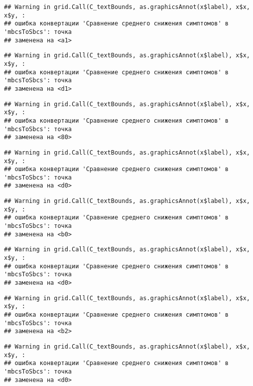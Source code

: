 \documentclass[
]{article}
\begin{document}
\begin{verbatim}
## Warning in grid.Call(C_textBounds, as.graphicsAnnot(x$label), x$x, x$y, :
## ошибка конвертации 'Сравнение среднего снижения симптомов' в 'mbcsToSbcs': точка
## заменена на <a1>
\end{verbatim}

\begin{verbatim}
## Warning in grid.Call(C_textBounds, as.graphicsAnnot(x$label), x$x, x$y, :
## ошибка конвертации 'Сравнение среднего снижения симптомов' в 'mbcsToSbcs': точка
## заменена на <d1>
\end{verbatim}

\begin{verbatim}
## Warning in grid.Call(C_textBounds, as.graphicsAnnot(x$label), x$x, x$y, :
## ошибка конвертации 'Сравнение среднего снижения симптомов' в 'mbcsToSbcs': точка
## заменена на <80>
\end{verbatim}

\begin{verbatim}
## Warning in grid.Call(C_textBounds, as.graphicsAnnot(x$label), x$x, x$y, :
## ошибка конвертации 'Сравнение среднего снижения симптомов' в 'mbcsToSbcs': точка
## заменена на <d0>
\end{verbatim}

\begin{verbatim}
## Warning in grid.Call(C_textBounds, as.graphicsAnnot(x$label), x$x, x$y, :
## ошибка конвертации 'Сравнение среднего снижения симптомов' в 'mbcsToSbcs': точка
## заменена на <b0>
\end{verbatim}

\begin{verbatim}
## Warning in grid.Call(C_textBounds, as.graphicsAnnot(x$label), x$x, x$y, :
## ошибка конвертации 'Сравнение среднего снижения симптомов' в 'mbcsToSbcs': точка
## заменена на <d0>
\end{verbatim}

\begin{verbatim}
## Warning in grid.Call(C_textBounds, as.graphicsAnnot(x$label), x$x, x$y, :
## ошибка конвертации 'Сравнение среднего снижения симптомов' в 'mbcsToSbcs': точка
## заменена на <b2>
\end{verbatim}

\begin{verbatim}
## Warning in grid.Call(C_textBounds, as.graphicsAnnot(x$label), x$x, x$y, :
## ошибка конвертации 'Сравнение среднего снижения симптомов' в 'mbcsToSbcs': точка
## заменена на <d0>
\end{verbatim}
\end{document}
